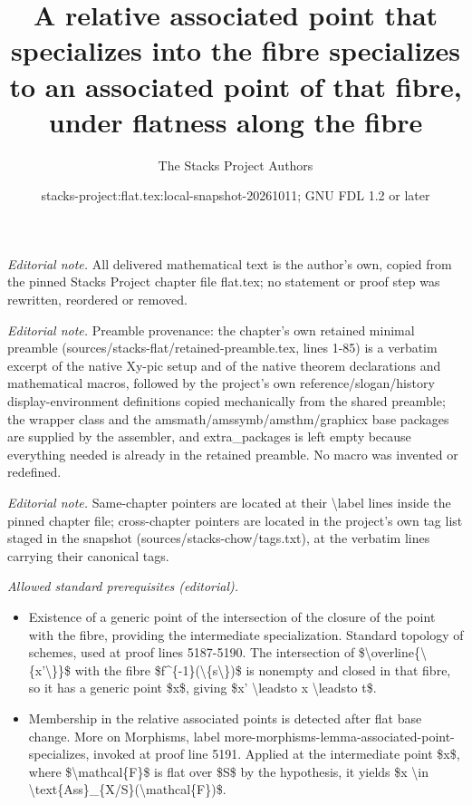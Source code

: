 \documentclass[10pt,a4paper]{amsart}
\title{A relative associated point that specializes into the fibre specializes to an associated point of that fibre, under flatness along the fibre}
\author{The Stacks Project Authors}
\date{stacks-project:flat.tex:local-snapshot-20261011; GNU FDL 1.2 or later}
\theoremstyle{plain}
\theoremstyle{definition}
\theoremstyle{remark}
\numberwithin{equation}{subsection}
\begin{document}
\maketitle
\noindent\textit{Editorial note.} All delivered mathematical text is the author's own, copied from the pinned Stacks Project chapter file flat.tex; no statement or proof step was rewritten, reordered or removed.\par\medskip
\noindent\textit{Editorial note.} Preamble provenance: the chapter's own retained minimal preamble (sources/stacks-flat/retained-preamble.tex, lines 1-85) is a verbatim excerpt of the native Xy-pic setup and of the native theorem declarations and mathematical macros, followed by the project's own reference/slogan/history display-environment definitions copied mechanically from the shared preamble; the wrapper class and the amsmath/amssymb/amsthm/graphicx base packages are supplied by the assembler, and extra\_packages is left empty because everything needed is already in the retained preamble. No macro was invented or redefined.\par\medskip
\noindent\textit{Editorial note.} Same-chapter pointers are located at their \textbackslash{}label lines inside the pinned chapter file; cross-chapter pointers are located in the project's own tag list staged in the snapshot (sources/stacks-chow/tags.txt), at the verbatim lines carrying their canonical tags.\par\medskip
\noindent\textit{Allowed standard prerequisites (editorial).}\begin{itemize}
\item Existence of a generic point of the intersection of the closure of the point with the fibre, providing the intermediate specialization. Standard topology of schemes, used at proof lines 5187-5190. The intersection of \$\textbackslash{}overline\{\textbackslash{}\{x'\textbackslash{}\}\}\$ with the fibre \$f\textasciicircum{}\{-1\}(\textbackslash{}\{s\textbackslash{}\})\$ is nonempty and closed in that fibre, so it has a generic point \$x\$, giving \$x' \textbackslash{}leadsto x \textbackslash{}leadsto t\$.
\item Membership in the relative associated points is detected after flat base change. More on Morphisms, label more-morphisms-lemma-associated-point-specializes, invoked at proof line 5191. Applied at the intermediate point \$x\$, where \$\textbackslash{}mathcal\{F\}\$ is flat over \$S\$ by the hypothesis, it yields \$x \textbackslash{}in \textbackslash{}text\{Ass\}\_\{X/S\}(\textbackslash{}mathcal\{F\})\$.
\end{itemize}\medskip
\end{document}
